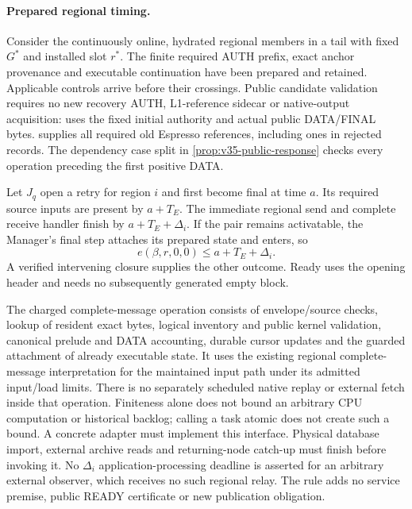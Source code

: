 \paragraph{Prepared regional timing.}
\label{sec:source-step-timing}
Consider the continuously online, hydrated regional members in a tail
with fixed $G^*$ and installed slot $r^*$. The finite required AUTH
prefix, exact anchor provenance and executable continuation have been
prepared and retained. Applicable controls arrive before their
crossings. Public candidate validation requires no new recovery AUTH,
L1-reference sidecar or native-output acquisition: 
uses the fixed initial authority and actual public DATA/FINAL bytes.
 supplies all required old Espresso
references, including ones in rejected records. The dependency case
split in \cref{prop:v35-public-response} checks every operation preceding
the first positive DATA.

Let $J_q$ open a retry for region $i$ and first become final at time
$a$. Its required source inputs are present by $a+T_E$. The immediate
regional send and complete receive handler finish by
$a+T_E+\Delta_i$. If the pair remains activatable, the Manager's final
step attaches its prepared state and enters, so
\[
 e(\beta,r,0,0)\le a+T_E+\Delta_i.
\]
A verified intervening closure supplies the other outcome. Ready uses
the opening header and needs no subsequently generated empty block.

The charged complete-message operation consists of envelope/source
checks, lookup of resident exact bytes, logical inventory and public
kernel validation, canonical prelude and DATA accounting, durable cursor
updates and the guarded attachment of already executable state. It uses
the existing regional complete-message interpretation for the maintained
input path under its admitted input/load limits. There is no separately
scheduled native replay or external fetch inside that operation.
Finiteness alone does not bound an arbitrary CPU computation or historical
backlog; calling a task atomic does not create such a bound. A concrete
adapter must implement this interface. Physical database import, external
archive reads and returning-node catch-up must finish before invoking
it. No $\Delta_i$ application-processing deadline is asserted for an
arbitrary external observer, which receives no such regional relay.
The rule adds no service premise, public READY certificate or new
publication obligation.
